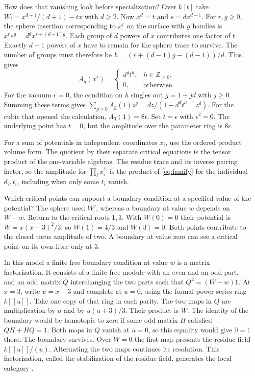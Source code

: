\documentclass{momentum}
\begin{document}
How does that vanishing look before specialization? Over \(k[t]\) take
\(W_t=x^{d+1}/(d+1)-tx\) with \(d\ge2\). Now \(x^d=t\) and \(e=d x^{d-1}\). For \(r,g\ge0\),
the sphere insertion corresponding to \(x^r\) on the surface with
\(g\) handles is \(x^r e^g=d^g x^{r+(d-1)g}\). Each group of \(d\)
powers of \(x\) contributes one factor of \(t\). Exactly \(d-1\)
powers of \(x\) have to remain for the sphere trace to survive.
The number of groups must therefore be
\(h=(r+(d-1)g-(d-1))/d\). This gives
\begin{equation}
 A_g(x^r)=
 \begin{cases}
 d^g t^h,&h\in\mathbb Z_{\ge0},\\
 0,&\text{otherwise}.
 \end{cases}
 \label{eq:family}
\end{equation}
For the vacuum \(r=0\), the condition on \(h\) singles out \(g=1+jd\)
with \(j\ge0\). Summing these terms gives
\(\sum_{g\ge0} A_g(1)z^g=dz/(1-d^d t^{d-1}z^d)\).
For the cubic that opened the calculation, \(A_3(1)=8t\).
Set \(t=\epsilon\) with \(\epsilon^2=0\). The underlying point
has \(t=0\), but the amplitude over the parameter ring is \(8\epsilon\).

For a sum of potentials in independent coordinates \(x_i\), use the
ordered product volume form. The quotient by their separate critical
equations is the tensor product of the one-variable algebras. The residue
trace and its inverse pairing factor, so the amplitude for
\(\prod_i x_i^{r_i}\) is the product of \eqref{eq:family} for
the individual \(d_i,t_i\), including when only some \(t_i\) vanish.

Which critical points can support a boundary condition at a specified
value of the potential? The sphere
used \(W'\), whereas a boundary at value \(w\) depends on \(W-w\).
Return to the critical roots \(1,3\). With \(W(0)=0\) their potential is
\(W=x(x-3)^2/3\), so \(W(1)=4/3\) and \(W(3)=0\). Both points contribute
to the closed torus amplitude of two. A boundary at value zero can
see a critical point on its own fibre only at \(3\).

In this model a finite free boundary condition at value \(w\) is a
matrix factorization. It consists of a finite free module with an
even and an odd part, and an odd matrix \(Q\) interchanging the two
parts such that \(Q^2=(W-w)1\). At \(x=3\), write \(u=x-3\) and
complete at \(u=0\), using the formal power series ring \(k[[u]]\).
Take one copy of that ring in each parity. The two maps in \(Q\) are
multiplication by \(u\) and by \(u(u+3)/3\). Their product is \(W\).
The identity of the boundary would be homotopic to zero if some odd
matrix \(H\) satisfied \(QH+HQ=1\). Both maps in \(Q\) vanish at \(u=0\),
so this equality would give \(0=1\) there. The boundary survives.
Over \(W=0\) the first map presents the residue field \(k[[u]]/(u)\).
Alternating the two maps continues its resolution. This factorization,
called the stabilization of the residue field, generates the local
category \cite[Thm.~4.1]{dyck}.
\end{document}
